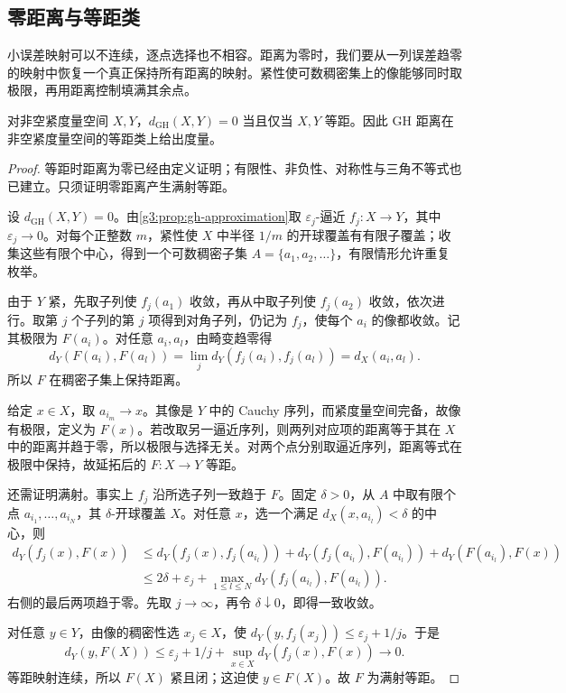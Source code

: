 \subsection{零距离与等距类}
\label{g3:subsec:1002:04}

小误差映射可以不连续，逐点选择也不相容。距离为零时，我们要从一列误差趋零的映射中恢复一个真正保持所有距离的映射。紧性使可数稠密集上的像能够同时取极限，再用距离控制填满其余点。

\begin{theorem}\label{g3:thm:gh-isometry-metric}
	对非空紧度量空间 \(X,Y\)，\(d_{\mathrm{GH}}(X,Y)=0\) 当且仅当 \(X,Y\) 等距。因此 GH 距离在非空紧度量空间的等距类上给出度量。
\end{theorem}
\begin{proof}
	等距时距离为零已经由定义证明；有限性、非负性、对称性与三角不等式也已建立。只须证明零距离产生满射等距。

	设 \(d_{\mathrm{GH}}(X,Y)=0\)。由\cref{g3:prop:gh-approximation}取 \(\varepsilon_j\)-逼近 \(f_j:X\to Y\)，其中 \(\varepsilon_j\to0\)。对每个正整数 \(m\)，紧性使 \(X\) 中半径 \(1/m\) 的开球覆盖有有限子覆盖；收集这些有限个中心，得到一个可数稠密子集 \(A=\{a_1,a_2,\ldots\}\)，有限情形允许重复枚举。

	由于 \(Y\) 紧，先取子列使 \(f_j(a_1)\) 收敛，再从中取子列使 \(f_j(a_2)\) 收敛，依次进行。取第 \(j\) 个子列的第 \(j\) 项得到对角子列，仍记为 \(f_j\)，使每个 \(a_i\) 的像都收敛。记其极限为 \(F(a_i)\)。对任意 \(a_i,a_l\)，由畸变趋零得
	\[
		d_Y(F(a_i),F(a_l))
		=\lim_jd_Y(f_j(a_i),f_j(a_l))=d_X(a_i,a_l).
	\]
	所以 \(F\) 在稠密子集上保持距离。

	给定 \(x\in X\)，取 \(a_{i_m}\to x\)。其像是 \(Y\) 中的 Cauchy 序列，而紧度量空间完备，故像有极限，定义为 \(F(x)\)。若改取另一逼近序列，则两列对应项的距离等于其在 \(X\) 中的距离并趋于零，所以极限与选择无关。对两个点分别取逼近序列，距离等式在极限中保持，故延拓后的 \(F:X\to Y\) 等距。

	还需证明满射。事实上 \(f_j\) 沿所选子列一致趋于 \(F\)。固定 \(\delta>0\)，从 \(A\) 中取有限个点 \(a_{i_1},\ldots,a_{i_N}\)，其 \(\delta\)-开球覆盖 \(X\)。对任意 \(x\)，选一个满足 \(d_X(x,a_{i_l})<\delta\) 的中心，则
	\[
	\begin{aligned}
		d_Y(f_j(x),F(x))
		&\le d_Y(f_j(x),f_j(a_{i_l}))
		+d_Y(f_j(a_{i_l}),F(a_{i_l}))
		+d_Y(F(a_{i_l}),F(x))\\
		&\le2\delta+\varepsilon_j+
		\max_{1\le l\le N}d_Y(f_j(a_{i_l}),F(a_{i_l})).
	\end{aligned}
	\]
	右侧的最后两项趋于零。先取 \(j\to\infty\)，再令 \(\delta\downarrow0\)，即得一致收敛。

	对任意 \(y\in Y\)，由像的稠密性选 \(x_j\in X\)，使 \(d_Y(y,f_j(x_j))\le\varepsilon_j+1/j\)。于是
	\[
		d_Y(y,F(X))\le\varepsilon_j+1/j+
		\sup_{x\in X}d_Y(f_j(x),F(x))\longrightarrow0.
	\]
	等距映射连续，所以 \(F(X)\) 紧且闭；这迫使 \(y\in F(X)\)。故 \(F\) 为满射等距。
\end{proof}


